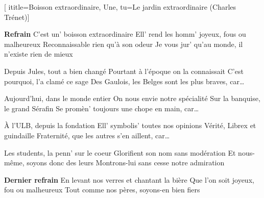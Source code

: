 [
  ititle={Boisson extraordinaire, Une},
  tu={Le jardin extraordinaire (Charles Trénet)}]

  
\beginchorus
\textbf{Refrain}
C'est un' boisson extraordinaire
Ell' rend les homm' joyeux, fous ou malheureux
Reconnaissable rien qu'à son odeur
Je vous jur' qu'au monde, il n'existe rien de mieux
\endchorus

\beginverse
Depuis Jules, tout a bien changé
Pourtant à l'époque on la connaissait
C'est pourquoi, l'a clamé ce sage
Des Gaulois, les Belges sont les plus braves, car…
\endverse

\beginverse
Aujourd'hui, dans le monde entier
On nous envie notre spécialité
Sur la banquise, le grand Sérafin
Se promèn' toujours une chope en main, car…
\endverse

\beginverse
À l'ULB, depuis la fondation
Ell' symbolis' toutes nos opinions
Vérité, Librex et guindaille
Fraternité, que les autres s'en aillent, car…
\endverse

\beginverse
Les students, la penn' sur le coeur
Glorifient son nom sans modération
Et nous-même, soyons donc des leurs
Montrons-lui sans cesse notre admiration
\endverse

\beginchorus
\textbf{Dernier refrain}
En levant nos verres et chantant la bière
Que l'on soit joyeux, fou ou malheureux
Tout comme nos pères, soyons-en bien fiers
\endchorus

\endsong
